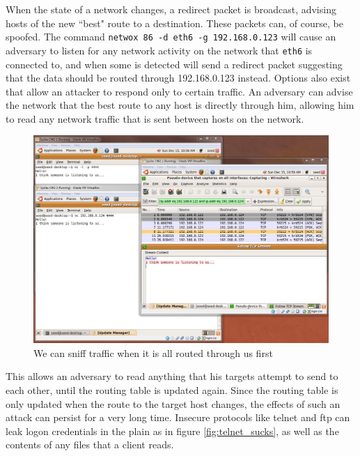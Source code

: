 When the state of a network changes, a redirect packet is broadcast, advising hosts of the new ``best" route to a
destination. These packets can, of course, be spoofed. The command {\tt netwox 86 -d eth6 -g 192.168.0.123} will cause
an adversary to listen for any network activity on the network that {\tt eth6} is connected to, and when some is
detected will send a redirect packet suggesting that the data should be routed through 192.168.0.123 instead. Options
also exist that allow an attacker to respond only to certain traffic. An adversary can advise the network that the best
route to any host is directly through him, allowing him to read any network traffic that is sent between hosts on the
network.



\begin{figure}[h]
    \centering
    \includegraphics[width=.7\linewidth]{images/icmp_redirect_after.png}
    \caption{We can sniff traffic when it is all routed through us first} \label{fig:icmp_after}
\end{figure}

This allows an adversary to read anything that his targets attempt to send to each other, until the routing table is
updated again. Since the routing table is only updated when the route to the target host changes, the effects of such an
attack can persist for a very long time. Insecure protocols like telnet and ftp can leak logon credentials in the plain
as in figure \ref{fig:telnet_sucks}, as well as the contents of any files that a client reads.

